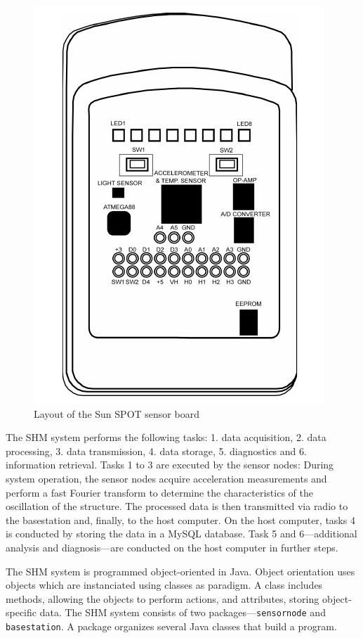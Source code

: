\documentclass[12pt,a4paper]{scrartcl}
\begin{document}
\begin{figure}[htb]
    \centering
    \includegraphics[scale=0.5]{figures/eDemoboard.png}
    \caption{Layout of the Sun SPOT sensor board \cite{spotToO}}
    \label{fig:SPOT}
\end{figure}

The SHM system performs the following tasks:
1. data acquisition,
2. data processing,
3. data transmission, 
4. data storage,
5. diagnostics and 
6. information retrieval.
Tasks 1 to 3 are executed by the sensor nodes: During system operation, the sensor nodes acquire acceleration measurements and perform a fast Fourier transform to determine the characteristics of the oscillation of the structure. 
The processed data is then transmitted via radio to the basestation and, finally, to the host computer.
On the host computer, tasks 4 is conducted by storing the data in a MySQL database.
Task 5 and 6---additional analysis and diagnosis---are conducted on the host computer in further steps.

The SHM system is programmed object-oriented in Java. 
Object orientation uses objects which are instanciated using classes as paradigm. 
A class includes methods, allowing the objects to perform actions, and attributes, storing object-specific data.
The SHM system consists of two packages---\texttt{sensornode} and \texttt{basestation}.
A package organizes several Java classes that build a program.
\end{document}
